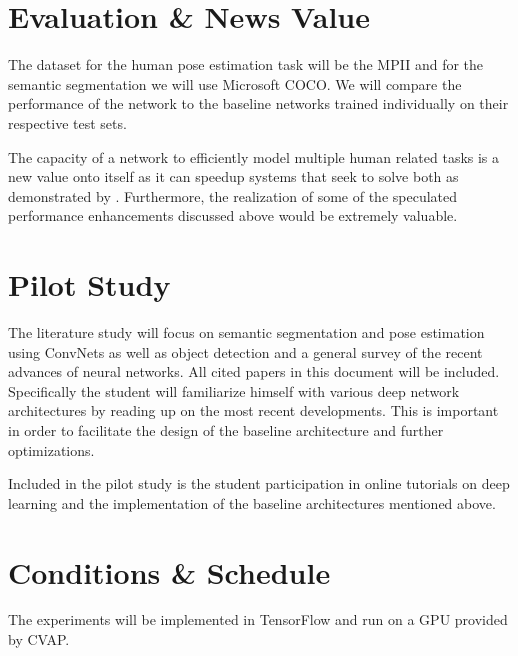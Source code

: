\documentclass[a4paper,10pt]{article}
\begin{document}
\section{Evaluation \& News Value}
The dataset for the human pose estimation task will be the MPII\cite{Andriluka} and for the semantic segmentation we will use Microsoft COCO\cite{Lin2014}.  We will compare the performance of the network to the baseline networks trained individually on their respective test sets.  

The capacity of a network to efficiently model multiple human related tasks is a new value onto itself as it can speedup systems that seek to solve both as demonstrated by \cite{Ren2015}.  Furthermore, the realization of some of the speculated performance enhancements discussed above would be extremely valuable.

\section{Pilot Study}
The literature study will focus on semantic segmentation and pose estimation using ConvNets as well as object detection and a general survey of the recent advances of neural networks.  All cited papers in this document will be included.  Specifically the student will familiarize himself with various deep network architectures by reading up on the  most recent developments.  This is important in order to facilitate the design of the baseline architecture and further optimizations.

Included in the pilot study is the student participation in online tutorials on deep learning and the implementation of the baseline architectures mentioned above.

 
\section{Conditions \& Schedule}
The experiments will be implemented in TensorFlow\cite{Abadi2015} and run on a GPU provided by CVAP.


\end{document}
